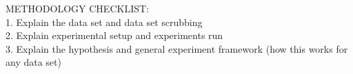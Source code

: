 METHODOLOGY CHECKLIST:\\
1. Explain the data set and data set scrubbing\\
2. Explain experimental setup and experiments run\\
3. Explain the hypothesis and general experiment framework (how this works for any data set)
